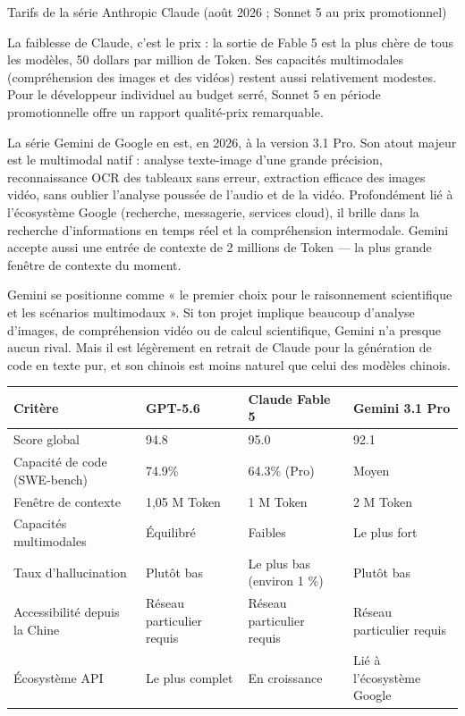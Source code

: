 \begin{center}\small\color{gray}Tarifs de la série Anthropic Claude (août 2026 ; Sonnet 5 au prix promotionnel)\end{center}

La faiblesse de Claude, c'est le prix : la sortie de Fable 5 est la plus chère de tous les modèles, 50 dollars par million de Token. Ses capacités multimodales (compréhension des images et des vidéos) restent aussi relativement modestes. Pour le développeur individuel au budget serré, Sonnet 5 en période promotionnelle offre un rapport qualité-prix remarquable.


La série Gemini de Google en est, en 2026, à la version 3.1 Pro. Son atout majeur est le multimodal natif : analyse texte-image d'une grande précision, reconnaissance OCR des tableaux sans erreur, extraction efficace des images vidéo, sans oublier l'analyse poussée de l'audio et de la vidéo. Profondément lié à l'écosystème Google (recherche, messagerie, services cloud), il brille dans la recherche d'informations en temps réel et la compréhension intermodale. Gemini accepte aussi une entrée de contexte de 2 millions de Token — la plus grande fenêtre de contexte du moment.

Gemini se positionne comme « le premier choix pour le raisonnement scientifique et les scénarios multimodaux ». Si ton projet implique beaucoup d'analyse d'images, de compréhension vidéo ou de calcul scientifique, Gemini n'a presque aucun rival. Mais il est légèrement en retrait de Claude pour la génération de code en texte pur, et son chinois est moins naturel que celui des modèles chinois.

\begin{center}
\begin{tabularx}{\linewidth}{|X|X|X|X|}
\hline
\textbf{Critère} & \textbf{GPT-5.6} & \textbf{Claude Fable 5} & \textbf{Gemini 3.1 Pro} \tabularnewline
\hline
Score global & 94.8 & 95.0 & 92.1 \tabularnewline
Capacité de code (SWE-bench) & 74.9\% & 64.3\% (Pro) & Moyen \tabularnewline
Fenêtre de contexte & 1,05 M Token & 1 M Token & 2 M Token \tabularnewline
Capacités multimodales & Équilibré & Faibles & Le plus fort \tabularnewline
Taux d'hallucination & Plutôt bas & Le plus bas (environ 1 \%) & Plutôt bas \tabularnewline
Accessibilité depuis la Chine & Réseau particulier requis & Réseau particulier requis & Réseau particulier requis \tabularnewline
Écosystème API & Le plus complet & En croissance & Lié à l'écosystème Google \tabularnewline
\hline
\end{tabularx}
\end{center}

